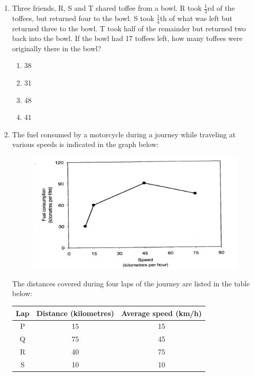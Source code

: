 \documentclass[journal,12pt,onecolumn]{IEEEtran}
\theoremstyle{remark}
\begin{document}
\begin{enumerate}
 

\item    \hspace{0.5cm} Three friends, R, S and T shared toffee from a bowl. R took $\frac{1}{3}$rd of the toffees, but returned four to the bowl. S took $\frac{1}{4}$th of what was left but returned three to the bowl. T took half of the remainder but returned two back into the bowl. If the bowl had 17 toffees left, how many toffees were originally there in the bowl?  \hfill{}

\begin{multicols}{2}
\begin{enumerate}
    \item 38
    \item 31
    \item 48
    \item 41
\end{enumerate}
\end{multicols}

 

\item    \hspace{0.5cm} The fuel consumed by a motorcycle during a journey while traveling at various speeds is indicated in the graph below:  \hfill{}

 

\begin{figure}
    \centering
    \includegraphics[width=\textwidth]{figs/image21.png}
    \caption{}
    \label{fig:figure21}
\end{figure}
 

The distances covered during four laps of the journey are listed in the table below:

 
\begin{center}
\begin{tabular}{|c|c|c|}
\hline
\textbf{Lap} & \textbf{Distance (kilometres)} & \textbf{Average speed (km/h)} \\
\hline
P & 15 & 15 \\
Q & 75 & 45 \\
R & 40 & 75 \\
S & 10 & 10 \\
\hline
\end{tabular}
\end{center}


\end{enumerate}
\end{document}
